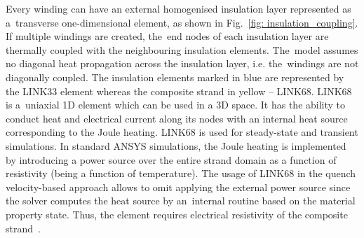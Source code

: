 Every winding can have an external homogenised insulation layer represented as a~transverse one-dimensional element, as shown in Fig.~\ref{fig: insulation_coupling}. If multiple windings are created, the~end nodes of each insulation layer are thermally coupled with the neighbouring insulation elements. The~model assumes no diagonal heat propagation across the insulation layer, i.e. the~windings are not diagonally coupled. The insulation elements marked in blue are represented by the LINK33 element whereas the composite strand in yellow -- LINK68. LINK68 is a~uniaxial 1D element which can be used in a 3D space. It has the ability to conduct heat and electrical current along its nodes with an internal heat source corresponding to the Joule heating. LINK68 is used for steady-state and transient simulations. In standard ANSYS simulations, the Joule heating is implemented by introducing a power source over the entire strand domain as a function of resistivity (being a function of temperature). The usage of LINK68 in the quench velocity-based approach allows to omit applying the external power source since the solver computes the heat source by an~internal routine based on the material property state. Thus, the element requires electrical resistivity of the composite strand~\cite{ansys_element_manual}.

